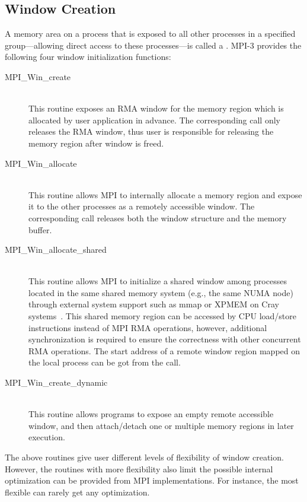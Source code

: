 \subsection{Window Creation}
A memory area on a process that is exposed to all other processes in a
specified group---allowing direct access to these processes---is called
a . MPI-3 provides the following four window initialization
functions:

\begin{description}
\item[MPI\_Win\_create]\hfill \\
This routine exposes an RMA window for the memory region which is allocated
by user application in advance. The corresponding 
call only releases the RMA window, thus user is responsible for releasing
the memory region after window is freed.

\item[MPI\_Win\_allocate]\hfill \\
This routine allows MPI to internally allocate a memory region and expose
it to the other processes as a remotely accessible window. The corresponding
 call releases both the window structure and the memory
buffer.

\item[MPI\_Win\_allocate\_shared]\hfill \\
This routine allows MPI to initialize a shared window among processes
located in the same shared memory system (e.g., the same NUMA node) through
external system support such as mmap or XPMEM on Cray systems~\cite{xpmem}.
This shared memory region can be accessed by CPU load\slash store instructions
instead of MPI RMA operations, however, additional synchronization is required
to ensure the correctness with other concurrent RMA operations. The start
address of a remote window region mapped on the local process can be got from
the  call.

\item[MPI\_Win\_create\_dynamic]\hfill \\
This routine allows programs to expose an empty remote accessible window,
and then attach\slash detach one or multiple memory regions in later execution.
\end{description}

The above routines give user different levels of flexibility of window
creation. However, the routines with more flexibility also limit the possible
internal optimization can be provided from MPI implementations. For instance,
the most flexible  can rarely get any
optimization.


